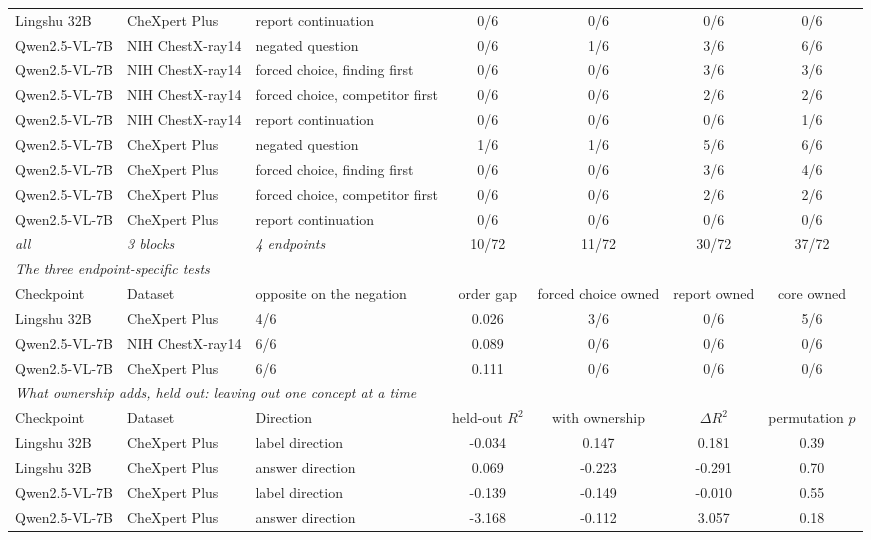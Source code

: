 \documentclass{article}
\begin{document}
\begin{table}[htbp]
{\begin{tabular}{lllcccc}
Lingshu 32B & CheXpert Plus & report continuation & 0/6 & 0/6 & 0/6 & 0/6 \\
Qwen2.5-VL-7B & NIH ChestX-ray14 & negated question & 0/6 & 1/6 & 3/6 & 6/6 \\
Qwen2.5-VL-7B & NIH ChestX-ray14 & forced choice, finding first & 0/6 & 0/6 & 3/6 & 3/6 \\
Qwen2.5-VL-7B & NIH ChestX-ray14 & forced choice, competitor first & 0/6 & 0/6 & 2/6 & 2/6 \\
Qwen2.5-VL-7B & NIH ChestX-ray14 & report continuation & 0/6 & 0/6 & 0/6 & 1/6 \\
Qwen2.5-VL-7B & CheXpert Plus & negated question & 1/6 & 1/6 & 5/6 & 6/6 \\
Qwen2.5-VL-7B & CheXpert Plus & forced choice, finding first & 0/6 & 0/6 & 3/6 & 4/6 \\
Qwen2.5-VL-7B & CheXpert Plus & forced choice, competitor first & 0/6 & 0/6 & 2/6 & 2/6 \\
Qwen2.5-VL-7B & CheXpert Plus & report continuation & 0/6 & 0/6 & 0/6 & 0/6 \\
\midrule
\textit{all} & \textit{3 blocks} & \textit{4 endpoints} & 10/72 & 11/72 & 30/72 & 37/72 \\
\midrule
\multicolumn{7}{l}{\textit{The three endpoint-specific tests}} \\
Checkpoint & Dataset & opposite on the negation & order gap & forced choice owned & report owned & core owned \\
\midrule
Lingshu 32B & CheXpert Plus & 4/6 & 0.026 & 3/6 & 0/6 & 5/6 \\
Qwen2.5-VL-7B & NIH ChestX-ray14 & 6/6 & 0.089 & 0/6 & 0/6 & 0/6 \\
Qwen2.5-VL-7B & CheXpert Plus & 6/6 & 0.111 & 0/6 & 0/6 & 0/6 \\
\midrule
\multicolumn{7}{l}{\textit{What ownership adds, held out: leaving out one concept at a time}} \\
Checkpoint & Dataset & Direction & held-out $R^2$ & with ownership & $\Delta R^2$ & permutation $p$ \\
\midrule
Lingshu 32B & CheXpert Plus & label direction & -0.034 & 0.147 & 0.181 & 0.39 \\
Lingshu 32B & CheXpert Plus & answer direction & 0.069 & -0.223 & -0.291 & 0.70 \\
Qwen2.5-VL-7B & CheXpert Plus & label direction & -0.139 & -0.149 & -0.010 & 0.55 \\
Qwen2.5-VL-7B & CheXpert Plus & answer direction & -3.168 & -0.112 & 3.057 & 0.18 \\

\end{tabular}}
\end{table}
\end{document}
